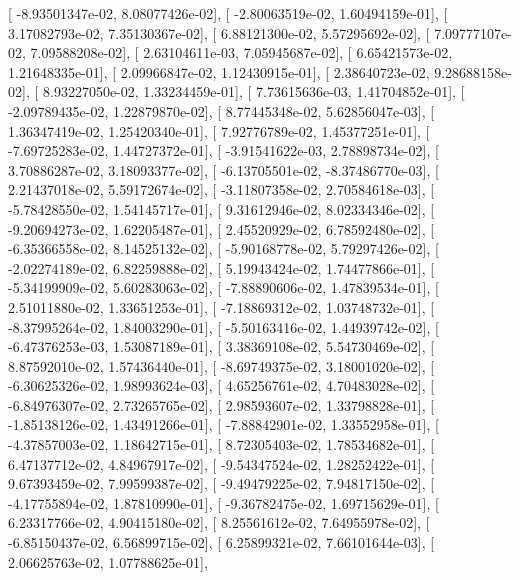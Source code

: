 \documentclass{article}
\begin{document}
       [ -8.93501347e-02,   8.08077426e-02],
       [ -2.80063519e-02,   1.60494159e-01],
       [  3.17082793e-02,   7.35130367e-02],
       [  6.88121300e-02,   5.57295692e-02],
       [  7.09777107e-02,   7.09588208e-02],
       [  2.63104611e-03,   7.05945687e-02],
       [  6.65421573e-02,   1.21648335e-01],
       [  2.09966847e-02,   1.12430915e-01],
       [  2.38640723e-02,   9.28688158e-02],
       [  8.93227050e-02,   1.33234459e-01],
       [  7.73615636e-03,   1.41704852e-01],
       [ -2.09789435e-02,   1.22879870e-02],
       [  8.77445348e-02,   5.62856047e-03],
       [  1.36347419e-02,   1.25420340e-01],
       [  7.92776789e-02,   1.45377251e-01],
       [ -7.69725283e-02,   1.44727372e-01],
       [ -3.91541622e-03,   2.78898734e-02],
       [  3.70886287e-02,   3.18093377e-02],
       [ -6.13705501e-02,  -8.37486770e-03],
       [  2.21437018e-02,   5.59172674e-02],
       [ -3.11807358e-02,   2.70584618e-03],
       [ -5.78428550e-02,   1.54145717e-01],
       [  9.31612946e-02,   8.02334346e-02],
       [ -9.20694273e-02,   1.62205487e-01],
       [  2.45520929e-02,   6.78592480e-02],
       [ -6.35366558e-02,   8.14525132e-02],
       [ -5.90168778e-02,   5.79297426e-02],
       [ -2.02274189e-02,   6.82259888e-02],
       [  5.19943424e-02,   1.74477866e-01],
       [ -5.34199909e-02,   5.60283063e-02],
       [ -7.88890606e-02,   1.47839534e-01],
       [  2.51011880e-02,   1.33651253e-01],
       [ -7.18869312e-02,   1.03748732e-01],
       [ -8.37995264e-02,   1.84003290e-01],
       [ -5.50163416e-02,   1.44939742e-02],
       [ -6.47376253e-03,   1.53087189e-01],
       [  3.38369108e-02,   5.54730469e-02],
       [  8.87592010e-02,   1.57436440e-01],
       [ -8.69749375e-02,   3.18001020e-02],
       [ -6.30625326e-02,   1.98993624e-03],
       [  4.65256761e-02,   4.70483028e-02],
       [ -6.84976307e-02,   2.73265765e-02],
       [  2.98593607e-02,   1.33798828e-01],
       [ -1.85138126e-02,   1.43491266e-01],
       [ -7.88842901e-02,   1.33552958e-01],
       [ -4.37857003e-02,   1.18642715e-01],
       [  8.72305403e-02,   1.78534682e-01],
       [  6.47137712e-02,   4.84967917e-02],
       [ -9.54347524e-02,   1.28252422e-01],
       [  9.67393459e-02,   7.99599387e-02],
       [ -9.49479225e-02,   7.94817150e-02],
       [ -4.17755894e-02,   1.87810990e-01],
       [ -9.36782475e-02,   1.69715629e-01],
       [  6.23317766e-02,   4.90415180e-02],
       [  8.25561612e-02,   7.64955978e-02],
       [ -6.85150437e-02,   6.56899715e-02],
       [  6.25899321e-02,   7.66101644e-03],
       [  2.06625763e-02,   1.07788625e-01],
\end{document}
